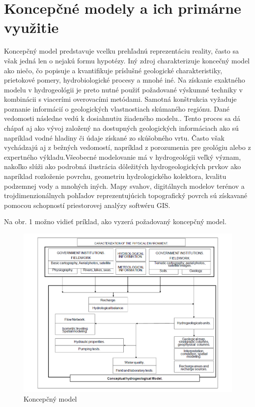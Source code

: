 \documentclass[10pt,twoside,slovak, a4paper]{article}
\begin{document}
\newpage

\section{Koncepčné modely a ich primárne využitie}\label{koncepcne}

Koncepčný model predstavuje vcelku prehľadnú reprezentáciu reality, často sa však jedná len o nejakú formu hypotézy.\cite{Tobon:CMiH} Iný zdroj charakterizuje koncečný model ako niečo, čo popisuje a kvantifikuje príslušné geologické charakteristiky, prietokové pomery, hydrobiologické procesy a mnohé iné.\cite{HC-Model} Na získanie exaktného modelu v hydrogeológii je preto nutné použiť požadované výskumné techniky v kombinácii s viacerími overovacími metódami. Samotná konštrukcia vyžaduje poznanie informácií o geologických vlastnostiach skúmaného regiónu. Dané vedomosti následne vedú k dosiahnutiu žiadeného modelu.\cite{Tobon:CMiH}. Tento proces sa dá chápať aj ako vývoj založený na dostupných geologických informáciach ako sú napríklad vodné hladiny či údaje získané zo skúšobného vrtu. Často však vychádzajú aj z bežných vedomostí, napríklad z porozumenia pre geológiu alebo z expertného výkladu.\cite{Enemark:HCMBaT}Všeobecné modelovanie má v hydrogeológii veľký význam, nakoľko slúži ako podrobná ilustrácia dôležitých hydrogeologických prvkov ako napríklad rozloženie povrchu, geometriu hydrologického kolektora, kvalitu podzemnej vody a mnohých iných. Mapy svahov, digitálnych modelov terénov a trojdimenzionálnych pohľadov reprezentujúcich topografický povrch sú získavané pomocou schopností priestorovej analýzy softwéru GIS. \cite{Tobon:CMiH}

Na obr. 1 možno vidieť príklad, ako vyzerá požadovaný koncepčný model.

\begin{figure}[tbh]
\centering
	\includegraphics[width=\linewidth]{fig1.png}
	\caption{Koncepčný model\cite{Tobon:CMiH}}
	\label{Obr:1}
\end{figure}
\end{document}
